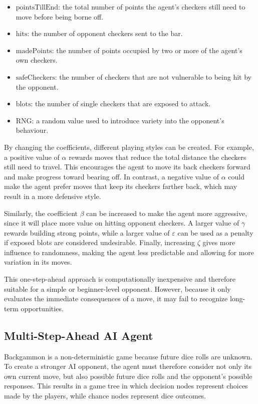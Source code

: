 \documentclass[11pt]{article}
\begin{document}
\begin{itemize}
    \item \(\text{pointsTillEnd}\): the total number of points the agent's checkers still need to move before being borne off.
    \item \(\text{hits}\): the number of opponent checkers sent to the bar.
    \item \(\text{madePoints}\): the number of points occupied by two or more of the agent's own checkers.
    \item \(\text{safeCheckers}\): the number of checkers that are not vulnerable to being hit by the opponent.
    \item \(\text{blots}\): the number of single checkers that are exposed to attack.
    \item \(\text{RNG}\): a random value used to introduce variety into the opponent's behaviour.
\end{itemize}

By changing the coefficients, different playing styles can be created. For example, a positive value of \(\alpha\) rewards moves that reduce the total distance the checkers still need to travel. This encourages the agent to move its back checkers forward and make progress toward bearing off. In contrast, a negative value of \(\alpha\) could make the agent prefer moves that keep its checkers farther back, which may result in a more defensive style.

Similarly, the coefficient \(\beta\) can be increased to make the agent more aggressive, since it will place more value on hitting opponent checkers. A larger value of \(\gamma\) rewards building strong points, while a larger value of \(\varepsilon\) can be used as a penalty if exposed blots are considered undesirable. Finally, increasing \(\zeta\) gives more influence to randomness, making the agent less predictable and allowing for more variation in its moves.

This one-step-ahead approach is computationally inexpensive and therefore suitable for a simple or beginner-level opponent. However, because it only evaluates the immediate consequences of a move, it may fail to recognize long-term opportunities.

\subsection{Multi-Step-Ahead AI Agent}
Backgammon is a non-deterministic game because future dice rolls are unknown. To create a stronger AI opponent, the agent must therefore consider not only its own current move, but also possible future dice rolls and the opponent's possible responses. This results in a game tree in which decision nodes represent choices made by the players, while chance nodes represent dice outcomes.
\end{document}
